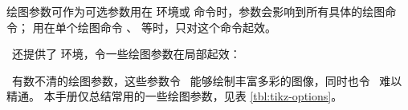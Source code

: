 绘图参数可作为可选参数用在  环境或  命令时，参数会影响到所有具体的绘图命令；
用在单个绘图命令 、 等时，只对这个命令起效。

\TikZ\ 还提供了  环境，令一些绘图参数在局部起效：
\begin{example}
\end{example}

\TikZ\ 有数不清的绘图参数，这些参数令 \TikZ\ 能够绘制丰富多彩的图像，同时也令 \TikZ\ 难以精通。
本手册仅总结常用的一些绘图参数，见表 \ref{tbl:tikz-options}。


